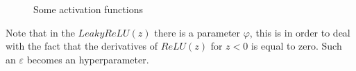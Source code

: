 \begin{figure}[h]
    \centering
    \caption{Some activation functions}
\end{figure}
\noindent
Note that in the $LeakyReLU(z)$ there is a parameter $\varphi$, this is in order to deal with the fact that the derivatives of $ReLU(z)$ for $z<0$ is equal to zero. Such an $\varepsilon$ becomes an hyperparameter.


